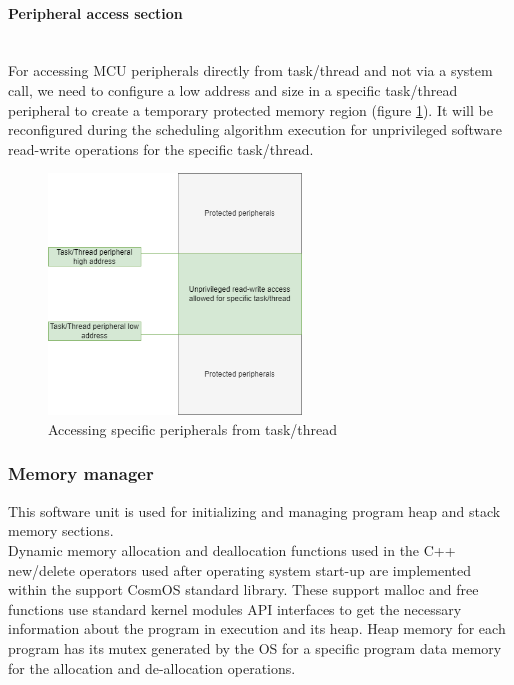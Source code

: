 \paragraph{Peripheral access section}\mbox{}\\
\indent For accessing \ac{MCU} peripherals directly from task/thread and not via a system call, we need to configure a low address and size in a specific task/thread peripheral to create a temporary protected memory region (figure \ref{fig:PeripheralAccess}). It will be reconfigured during the scheduling algorithm execution for unprivileged software read-write operations for the specific task/thread.

\begin{figure}[H]
\begin{center}
\includegraphics[width=0.6\textwidth]{images/peripheral_access.png}
\caption{Accessing specific peripherals from task/thread}
\label{fig:PeripheralAccess}
\end{center}
\end{figure}

\subsubsection{Memory manager}
This software unit is used for initializing and managing program heap and stack memory sections.\\
\indent Dynamic memory allocation and deallocation functions used in the C++ new/delete operators used after operating system start-up are implemented within the support CosmOS standard library. These support malloc and free functions use standard kernel modules \ac{API} interfaces to get the necessary information about the program in execution and its heap. Heap memory for each program has its mutex generated by the \ac{OS} for a specific program data memory for the allocation and de-allocation operations.

